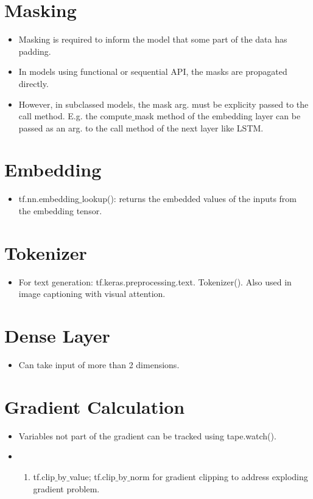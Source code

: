 \documentclass[11pt]{article}
\begin{document}
\begin{multicols*}{2}
\section{Masking}
\begin{itemize}
\item Masking is required to inform the model that some part of the data has padding.
\item In models using functional or sequential API, the masks are propagated directly.
\item However, in subclassed models, the mask arg. must be explicity passed to the call method. E.g. the compute$\_$mask method of the embedding layer can be passed as an arg. to the call method of the next layer like LSTM.
\end{itemize}

\section{Embedding}
\begin{itemize}
\item tf.nn.embedding$\_$lookup(): returns the embedded values of the inputs from the embedding tensor.
\end{itemize}

\section{Tokenizer}
\begin{itemize}
\item For text generation: tf.keras.preprocessing.text. Tokenizer(). Also used in image captioning with visual attention.
\end{itemize}

\section{Dense Layer}
\begin{itemize}
\item Can take input of more than 2 dimensions.
\end{itemize}

\section{Gradient Calculation}
\begin{itemize}
  \item Variables not part of the gradient can be tracked using tape.watch().
  \item \begin{enumerate}
    \item tf.clip$\_$by$\_$value; tf.clip$\_$by$\_$norm for gradient clipping to address exploding gradient problem.
  \end{enumerate}
\end{itemize}


\end{multicols*}
\end{document}
